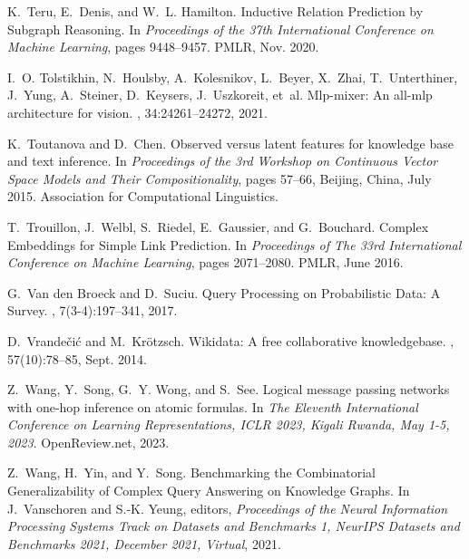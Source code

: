 \documentclass[11pt]{article}
\begin{document}
\begin{thebibliography}{10}
\begin{small}
K.~Teru, E.~Denis, and W.~L. Hamilton.
\newblock Inductive {{Relation Prediction}} by {{Subgraph Reasoning}}.
\newblock In {\em Proceedings of the 37th {{International Conference}} on
  {{Machine Learning}}}, pages 9448--9457. {PMLR}, Nov. 2020.

I.~O. Tolstikhin, N.~Houlsby, A.~Kolesnikov, L.~Beyer, X.~Zhai, T.~Unterthiner,
  J.~Yung, A.~Steiner, D.~Keysers, J.~Uszkoreit, et~al.
\newblock Mlp-mixer: An all-mlp architecture for vision.
,
  34:24261--24272, 2021.

K.~Toutanova and D.~Chen.
\newblock Observed versus latent features for knowledge base and text
  inference.
\newblock In {\em Proceedings of the 3rd {{Workshop}} on {{Continuous Vector
  Space Models}} and Their {{Compositionality}}}, pages 57--66, {Beijing,
  China}, July 2015. {Association for Computational Linguistics}.

T.~Trouillon, J.~Welbl, S.~Riedel, E.~Gaussier, and G.~Bouchard.
\newblock Complex {{Embeddings}} for {{Simple Link Prediction}}.
\newblock In {\em Proceedings of {{The}} 33rd {{International Conference}} on
  {{Machine Learning}}}, pages 2071--2080. {PMLR}, June 2016.

G.~{Van den Broeck} and D.~Suciu.
\newblock Query {{Processing}} on {{Probabilistic Data}}: {{A Survey}}.
,
  7(3-4):197--341, 2017.

D.~Vrande{\v c}i{\'c} and M.~Kr{\"o}tzsch.
\newblock Wikidata: A free collaborative knowledgebase.
, 57(10):78--85, Sept. 2014.

Z.~Wang, Y.~Song, G.~Y. Wong, and S.~See.
\newblock Logical message passing networks with one-hop inference on atomic
  formulas.
\newblock In {\em The Eleventh International Conference on Learning
  Representations, {ICLR} 2023, Kigali Rwanda, May 1-5, 2023}. OpenReview.net,
  2023.

Z.~Wang, H.~Yin, and Y.~Song.
\newblock Benchmarking the {{Combinatorial Generalizability}} of {{Complex
  Query Answering}} on {{Knowledge Graphs}}.
\newblock In J.~Vanschoren and S.-K. Yeung, editors, {\em Proceedings of the
  {{Neural Information Processing Systems Track}} on {{Datasets}} and
  {{Benchmarks}} 1, {{NeurIPS Datasets}} and {{Benchmarks}} 2021, {{December}}
  2021, Virtual}, 2021.


\end{small}
\end{thebibliography}
\end{document}

